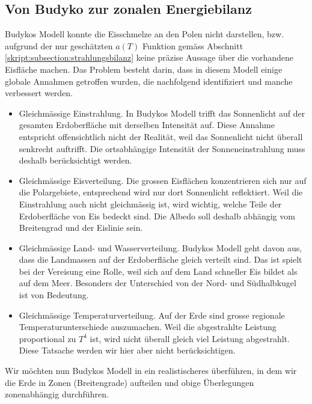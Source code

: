 \begin{refsection}
\section{Von Budyko zur zonalen Energiebilanz}
Budykos Modell konnte die Eisschmelze an den Polen nicht darstellen, bzw. aufgrund der nur geschätzten $a(T)$ Funktion gemäss Abschnitt \ref{skript:subsection:strahlungsbilanz} keine präzise Aussage über die vorhandene Eisfläche machen. Das Problem besteht darin, dass in diesem Modell einige globale Annahmen getroffen wurden, die nachfolgend identifiziert und manche verbessert werden.
\begin{itemize}
	\item Gleichmässige Einstrahlung. In Budykos Modell trifft das Sonnenlicht auf der gesamten Erdoberfläche mit derselben Intensität auf. Diese Annahme entspricht offensichtlich nicht der Realität, weil das Sonnenlicht nicht überall senkrecht auftrifft. Die ortsabhängige Intensität der Sonneneinstrahlung muss deshalb berücksichtigt werden.
	\item Gleichmässige Eisverteilung. Die grossen Eisflächen konzentrieren sich nur auf die Polargebiete, entsprechend wird nur dort Sonnenlicht reflektiert. Weil die Einstrahlung auch nicht gleichmässig ist, wird wichtig, welche Teile der Erdoberfläche von Eis bedeckt sind. Die Albedo soll deshalb abhängig vom Breitengrad und der Eislinie sein.
	\item Gleichmässige Land- und Wasserverteilung. Budykos Modell geht davon aus, dass die Landmassen auf der Erdoberfläche gleich verteilt sind. Das ist spielt bei der Vereisung eine Rolle, weil sich auf dem Land schneller Eis bildet als auf dem Meer. Besonders der Unterschied von der Nord- und Südhalbkugel ist von Bedeutung.
	\item Gleichmässige Temperaturverteilung. Auf der Erde sind grosse regionale Temperaturunterschiede auszumachen. Weil die abgestrahlte Leistung proportional zu $T^4$ ist, wird nicht überall gleich viel Leistung abgestrahlt. Diese Tatsache werden wir hier aber nicht berücksichtigen.
\end{itemize}
Wir möchten nun Budykos Modell in ein realistischeres überführen, in dem wir die Erde in Zonen (Breitengrade) aufteilen und obige Überlegungen zonenabhängig durchführen.

\end{refsection}
